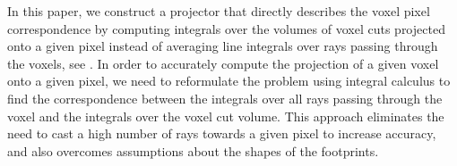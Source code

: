 In this paper, we construct a projector that directly describes the voxel pixel correspondence by computing integrals over the volumes of voxel cuts projected onto a given pixel instead of averaging line integrals over rays passing through the voxels, see . In order to accurately compute the projection of a given voxel onto a given pixel, we need to reformulate the problem using integral calculus to find the correspondence between the integrals over all rays passing through the voxel and the integrals over the voxel cut volume. This approach eliminates the need to cast a high number of rays towards a given pixel to increase accuracy, and also overcomes assumptions about the shapes of the footprints.
